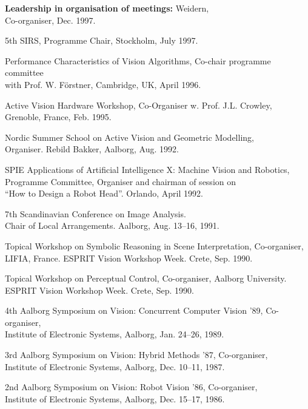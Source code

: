 \documentclass{article}
\begin{document}
\begin{cv}
\begin{cvlist}{\bf Leadership in organisation of meetings:}
		Weidern,\\ Co-organiser, \cftdotfill{\cftdotsep} Dec. 1997.
		\item 5th SIRS, Programme Chair, Stockholm, \cftdotfill{\cftdotsep} July 1997.
		\item Performance Characteristics of Vision Algorithms, Co-chair programme
		committee\\ with Prof. W. F\"orstner, Cambridge, UK, \cftdotfill{\cftdotsep}
		April 1996.
		\item Active Vision Hardware Workshop, Co-Organiser w. Prof. J.L. Crowley,
		\\Grenoble, France,\cftdotfill{\cftdotsep} Feb. 1995.
		\item Nordic Summer School on Active Vision and Geometric Modelling, \\
		Organiser. Rebild Bakker, Aalborg, \cftdotfill{\cftdotsep} Aug. 1992.
		\item SPIE Applications of Artificial Intelligence X: Machine Vision and
		Robotics, \\ Programme Committee, Organiser and chairman of session on\\ ``How
		to Design a Robot Head''. Orlando, \cftdotfill{\cftdotsep} April 1992.
		\item 7th Scandinavian Conference on Image Analysis. \\Chair of Local
		Arrangements. Aalborg, \cftdotfill{\cftdotsep} Aug. 13--16, 1991.
		\item Topical Workshop on Symbolic Reasoning in Scene Interpretation,
		Co-organiser, \\LIFIA, France. ESPRIT Vision Workshop Week. Crete,
		\cftdotfill{\cftdotsep} Sep. 1990.
		\item Topical Workshop on Perceptual Control, Co-organiser, Aalborg
		University. \\ ESPRIT Vision Workshop Week. Crete, \cftdotfill{\cftdotsep}
		Sep. 1990.
		\item 4th Aalborg Symposium on Vision: Concurrent Computer Vision '89,
		Co-organiser, \\ Institute of Electronic Systems, Aalborg,
		\cftdotfill{\cftdotsep} Jan. 24--26, 1989.
		\item 3rd Aalborg Symposium on Vision: Hybrid Methods '87, Co-organiser, \\
		Institute of Electronic Systems, Aalborg, \cftdotfill{\cftdotsep} Dec. 10--11,
		1987.
		\item 2nd Aalborg Symposium on Vision: Robot Vision '86, Co-organiser, \\
		Institute of Electronic Systems, Aalborg, \cftdotfill{\cftdotsep} Dec. 15--17,
		1986.
	\end{cvlist}


\end{cv}
\end{document}
